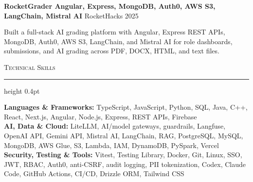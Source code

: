 \documentclass[letterpaper,11pt]{article}
\newcommand{\resumesection}[1]{%
  \par\vspace{2pt}%
  {\large\scshape #1}\par\vspace{2pt}%
  \hrule height 0.4pt\vspace{2pt}%
}
\newcommand{\projectHeading}[2]{
  \textbf{#1} \hfill #2
}
\begin{document}
\vspace{-2pt}
\projectHeading{RocketGrader \textbar{} Angular, Express, MongoDB, Auth0, AWS S3, LangChain, Mistral AI}{RocketHacks 2025}
\begin{tightitemize}
  \item Built a full-stack AI grading platform with Angular, Express REST APIs, MongoDB, Auth0, AWS S3, LangChain, and Mistral AI for role dashboards, submissions, and AI grading across PDF, DOCX, HTML, and text files.
\end{tightitemize}

\resumesection{Technical Skills}
\textbf{Languages \& Frameworks:} TypeScript, JavaScript, Python, SQL, Java, C++, React, Next.js, Angular, Node.js, Express, REST APIs, Firebase\\
\textbf{AI, Data \& Cloud:} LiteLLM, AI/model gateways, guardrails, Langfuse, OpenAI API, Gemini API, Mistral AI, LangChain, RAG, PostgreSQL, MySQL, MongoDB, AWS Glue, S3, Lambda, IAM, DynamoDB, PySpark, Vercel\\
\textbf{Security, Testing \& Tools:} Vitest, Testing Library, Docker, Git, Linux, SSO, JWT, RBAC, Auth0, anti-CSRF, audit logging, PII tokenization, Codex, Claude Code, GitHub Actions, CI/CD, Drizzle ORM, Tailwind CSS
\end{document}
